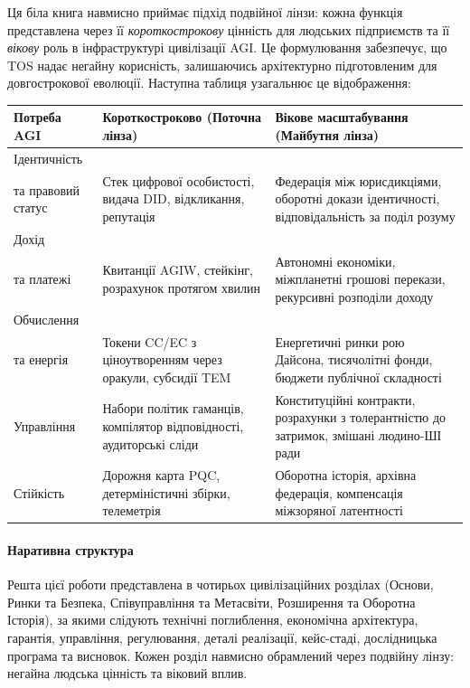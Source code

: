 \documentclass[11pt]{article}
\begin{document}
Ця біла книга навмисно приймає підхід подвійної лінзи: кожна функція представлена через її \emph{короткострокову} цінність для людських підприємств та її \emph{вікову} роль в інфраструктурі цивілізації AGI. Це формулювання забезпечує, що TOS надає негайну корисність, залишаючись архітектурно підготовленим для довгострокової еволюції. Наступна таблиця узагальнює це відображення:

\begin{longtable}{@{}p{}p{}p{}@{}}
\toprule
\textbf{Потреба AGI} & \textbf{Короткостроково (Поточна лінза)} & \textbf{Вікове масштабування (Майбутня лінза)} \\\midrule
Ідентичність \\ та правовий статус & Стек цифрової особистості, видача DID, відкликання, репутація & Федерація між юрисдикціями, оборотні докази ідентичності, відповідальність за поділ розуму \\
Дохід \\ та платежі & Квитанції AGIW, стейкінг, розрахунок протягом хвилин & Автономні економіки, міжпланетні грошові перекази, рекурсивні розподіли доходу \\
Обчислення \\ та енергія & Токени CC/EC з ціноутворенням через оракули, субсидії TEM & Енергетичні ринки рою Дайсона, тисячолітні фонди, бюджети публічної складності \\
Управління & Набори політик гаманців, компілятор відповідності, аудиторські сліди & Конституційні контракти, розрахунки з толерантністю до затримок, змішані людино-ШІ ради \\
Стійкість & Дорожня карта PQC, детерміністичні збірки, телеметрія & Оборотна історія, архівна федерація, компенсація міжзоряної латентності \\\bottomrule
\end{longtable}

\paragraph{Наративна структура} Решта цієї роботи представлена в чотирьох цивілізаційних розділах (Основи, Ринки та Безпека, Співуправління та Метасвіти, Розширення та Оборотна Історія), за якими слідують технічні поглиблення, економічна архітектура, гарантія, управління, регулювання, деталі реалізації, кейс-стаді, дослідницька програма та висновок. Кожен розділ навмисно обрамлений через подвійну лінзу: негайна людська цінність та віковий вплив.
\end{document}
